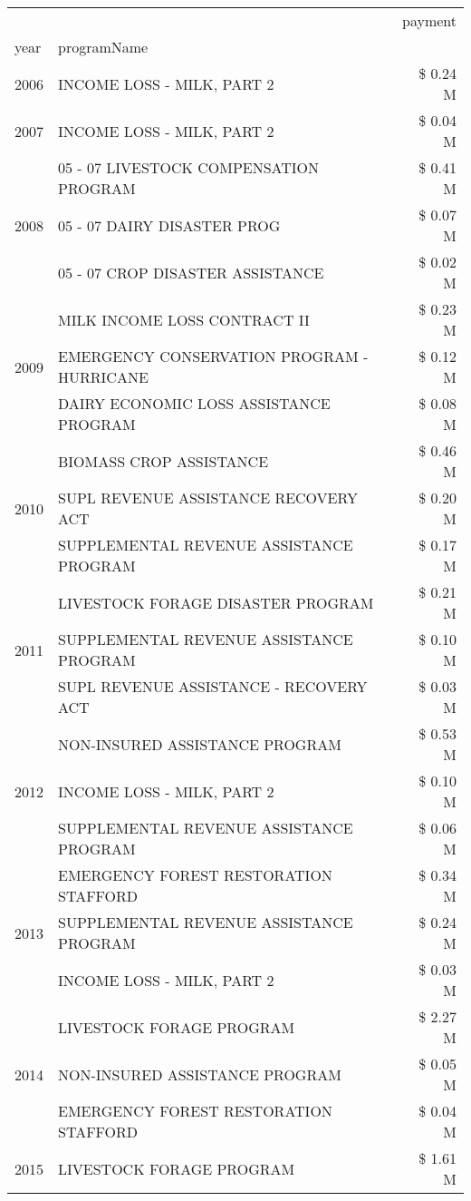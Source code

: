 \begin{tabular}{llr}
\toprule
 &  & payment \\
year & programName &  \\
\midrule
2006 & INCOME LOSS - MILK, PART 2 & \$ 0.24 M \\
\cline{1-3}
2007 & INCOME LOSS - MILK, PART 2 & \$ 0.04 M \\
\cline{1-3}
\multirow[t]{3}{*}{2008} & 05 - 07 LIVESTOCK COMPENSATION PROGRAM & \$ 0.41 M \\
 & 05 - 07 DAIRY DISASTER PROG & \$ 0.07 M \\
 & 05 - 07 CROP DISASTER ASSISTANCE & \$ 0.02 M \\
\cline{1-3}
\multirow[t]{3}{*}{2009} & MILK INCOME LOSS CONTRACT II & \$ 0.23 M \\
 & EMERGENCY CONSERVATION PROGRAM - HURRICANE & \$ 0.12 M \\
 & DAIRY ECONOMIC LOSS ASSISTANCE PROGRAM & \$ 0.08 M \\
\cline{1-3}
\multirow[t]{3}{*}{2010} & BIOMASS CROP ASSISTANCE & \$ 0.46 M \\
 & SUPL REVENUE ASSISTANCE RECOVERY ACT & \$ 0.20 M \\
 & SUPPLEMENTAL REVENUE ASSISTANCE PROGRAM & \$ 0.17 M \\
\cline{1-3}
\multirow[t]{3}{*}{2011} & LIVESTOCK FORAGE DISASTER PROGRAM & \$ 0.21 M \\
 & SUPPLEMENTAL REVENUE ASSISTANCE PROGRAM & \$ 0.10 M \\
 & SUPL REVENUE ASSISTANCE - RECOVERY ACT & \$ 0.03 M \\
\cline{1-3}
\multirow[t]{3}{*}{2012} & NON-INSURED ASSISTANCE PROGRAM & \$ 0.53 M \\
 & INCOME LOSS - MILK, PART 2 & \$ 0.10 M \\
 & SUPPLEMENTAL REVENUE ASSISTANCE PROGRAM & \$ 0.06 M \\
\cline{1-3}
\multirow[t]{3}{*}{2013} & EMERGENCY FOREST RESTORATION STAFFORD & \$ 0.34 M \\
 & SUPPLEMENTAL REVENUE ASSISTANCE PROGRAM & \$ 0.24 M \\
 & INCOME LOSS - MILK, PART 2 & \$ 0.03 M \\
\cline{1-3}
\multirow[t]{3}{*}{2014} & LIVESTOCK FORAGE PROGRAM & \$ 2.27 M \\
 & NON-INSURED ASSISTANCE PROGRAM & \$ 0.05 M \\
 & EMERGENCY FOREST RESTORATION STAFFORD & \$ 0.04 M \\
\cline{1-3}
\multirow[t]{3}{*}{2015} & LIVESTOCK FORAGE PROGRAM & \$ 1.61 M \\

\end{tabular}

